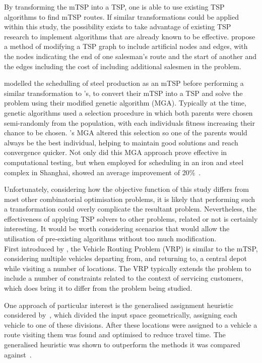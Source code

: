 By transforming the mTSP into a TSP, one is able to use existing TSP algorithms to find mTSP routes.
If similar transformations could be applied within this study, the possibility exists to take advantage of existing TSP
research to implement algorithms that are already known to be effective.
\textcite{bellmore1974transformation} propose a method of modifying a TSP graph to include artificial nodes and
edges, with the nodes indicating the end of one salesman's route and the start of another and the edges including
the cost of including additional salesmen in the problem.

\textcite{tang2000multiple} modelled the schedulling of steel production as an mTSP before performing a similar
transformation to \textcite{bellmore1974transformation}'s, to convert their mTSP into a TSP and solve the problem
using their modified genetic algorithm (MGA).
Typically at the time, genetic algorithms used a selection procedure in which both parents were chosen semi-randomly
from the population, with each individuals fitness increasing their chance to be chosen.
\textcite{tang2000multiple}'s MGA altered this selection so one of the parents would always be the best individual,
helping to maintain good solutions and reach convergence quicker.
Not only did this MGA approach prove effective in computational testing, but when employed for scheduling in an iron
and steel complex in Shanghai, showed an average improvement of 20\%~\parencite[p. 278--281]{tang2000multiple}.

Unfortunately, considering how the objective function of this study differs from most other combinatorial optimisation
problems, it is likely that performing such a transformation could overly complicate the resultant problem.
Nevertheless, the effectiveness of applying TSP solvers to other problems, related or not is certainly interesting.
It would be worth considering scenarios that would allow the utilisation of pre-existing algorithms without too much
modification.\\

\noindent
First introduced by \textcite{dantzig1959truck}, the Vehicle Routing Problem (VRP) is similar to the mTSP, considering
multiple vehicles departing from, and returning to, a central depot while visiting a number of locations.
The VRP typically extends the problem to include a number of constraints related to the context of servicing
customers, which does bring it to differ from the problem being studied.

One approach of particular interest is the generalised assignment heuristic considered by~\textcite{fisher1981generalized},
which divided the input space geometrically, assigning each vehicle to one of these divisions.
After these locations were assigned to a vehicle a route visiting them was found and optimised to reduce travel time.
The generalised heuristic was shown to outperform the methods it was compared against~\parencite[p. 123]{fisher1981generalized}.

